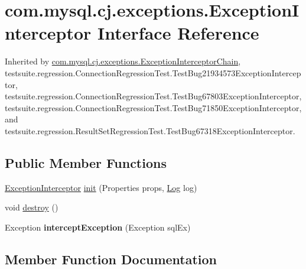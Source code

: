 \hypertarget{interfacecom_1_1mysql_1_1cj_1_1exceptions_1_1_exception_interceptor}{}\section{com.\+mysql.\+cj.\+exceptions.\+Exception\+Interceptor Interface Reference}
\label{interfacecom_1_1mysql_1_1cj_1_1exceptions_1_1_exception_interceptor}


Inherited by \mbox{\hyperlink{classcom_1_1mysql_1_1cj_1_1exceptions_1_1_exception_interceptor_chain}{com.\+mysql.\+cj.\+exceptions.\+Exception\+Interceptor\+Chain}}, testsuite.\+regression.\+Connection\+Regression\+Test.\+Test\+Bug21934573\+Exception\+Interceptor, testsuite.\+regression.\+Connection\+Regression\+Test.\+Test\+Bug67803\+Exception\+Interceptor, testsuite.\+regression.\+Connection\+Regression\+Test.\+Test\+Bug71850\+Exception\+Interceptor, and testsuite.\+regression.\+Result\+Set\+Regression\+Test.\+Test\+Bug67318\+Exception\+Interceptor.

\subsection*{Public Member Functions}
\begin{DoxyCompactItemize}
\item 
\mbox{\hyperlink{interfacecom_1_1mysql_1_1cj_1_1exceptions_1_1_exception_interceptor}{Exception\+Interceptor}} \mbox{\hyperlink{interfacecom_1_1mysql_1_1cj_1_1exceptions_1_1_exception_interceptor_a5488d80601434446f3f5f73c27226417}{init}} (Properties props, \mbox{\hyperlink{interfacecom_1_1mysql_1_1cj_1_1log_1_1_log}{Log}} log)
\item 
void \mbox{\hyperlink{interfacecom_1_1mysql_1_1cj_1_1exceptions_1_1_exception_interceptor_a225145c1c4b2c7e2d20cfd0bc4e1d332}{destroy}} ()
\item 
\mbox{\label{interfacecom_1_1mysql_1_1cj_1_1exceptions_1_1_exception_interceptor_ab77cba0ffef1d2d6921d29e2eb79b072}} 
Exception {\bfseries intercept\+Exception} (Exception sql\+Ex)
\end{DoxyCompactItemize}


\subsection{Member Function Documentation}
\mbox{\label{interfacecom_1_1mysql_1_1cj_1_1exceptions_1_1_exception_interceptor_a225145c1c4b2c7e2d20cfd0bc4e1d332}} 
